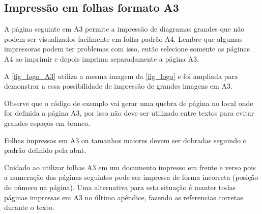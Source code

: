 
\subsection{Impressão em folhas formato A3}

A página seguinte em A3 permite a impressão de diagramas grandes que não podem ser visualizados facilmente em folha padrão A4. Lembre que algumas impressoras podem ter problemas com isso, então selecione somente as páginas A4 ao imprimir e depois imprima separadamente a página A3.

A \autoref{fig_logo_A3} utiliza a mesma imagem da \autoref{fig_logo} e foi ampliada para demonstrar a essa possibilidade de impressão de grandes imagens em A3.

Observe que o código de exemplo vai gerar uma quebra de página no local onde for definida a página A3, por isso não deve ser utilizado entre textos para evitar grandes espaços em branco.

Folhas impressas em A3 ou tamanhos maiores devem ser dobradas seguindo o padrão definido pela \ac{abnt}. 


Cuidado ao utilizar folhas A3 em um documento impresso em frente e verso pois a numeração das páginas seguintes pode ser impressa de forma incorreta (posição do número na página). Uma alternativa para esta situação é manter todas páginas impressas em A3 no último apêndice, fazendo as referencias corretas durante o texto.



